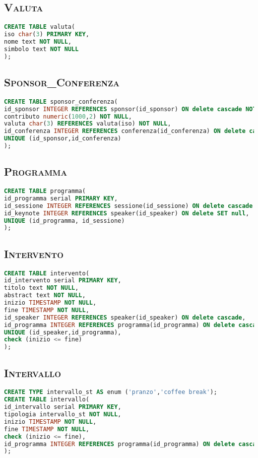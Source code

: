 \subsection{\textsc{Valuta}}
\begin{lstlisting}[language=SQL,style=mystyle,caption={Tabella: Valuta}]
CREATE TABLE valuta(
iso char(3) PRIMARY KEY,
nome text NOT NULL,
simbolo text NOT NULL
);
\end{lstlisting}
\subsection{\textsc{Sponsor\_Conferenza}}
\begin{lstlisting}[language=SQL,style=mystyle, caption={Tabella: Sponsor\_Conferenza}]
CREATE TABLE sponsor_conferenza(
id_sponsor INTEGER REFERENCES sponsor(id_sponsor) ON delete cascade NOT NULL,
contributo numeric(1000,2) NOT NULL,
valuta char(3) REFERENCES valuta(iso) NOT NULL,
id_conferenza INTEGER REFERENCES conferenza(id_conferenza) ON delete cascade NOT NULL,
UNIQUE (id_sponsor,id_conferenza) 
);
\end{lstlisting}
\subsection{\textsc{Programma}}
\begin{lstlisting}[language=SQL,style=mystyle,caption={Tabella: Programma}]
CREATE TABLE programma(
id_programma serial PRIMARY KEY,
id_sessione INTEGER REFERENCES sessione(id_sessione) ON delete cascade NOT NULL,
id_keynote INTEGER REFERENCES speaker(id_speaker) ON delete SET null,
UNIQUE (id_programma, id_sessione)
);

\end{lstlisting}
\subsection{\textsc{Intervento}}
\begin{lstlisting}[language=SQL,style=mystyle, caption={Tabella: Intervento}]
CREATE TABLE intervento(
id_intervento serial PRIMARY KEY,
titolo text NOT NULL,
abstract text NOT NULL,
inizio TIMESTAMP NOT NULL,
fine TIMESTAMP NOT NULL,
id_speaker INTEGER REFERENCES speaker(id_speaker) ON delete cascade,
id_programma INTEGER REFERENCES programma(id_programma) ON delete cascade NOT NULL,
UNIQUE (id_speaker,id_programma), 
check (inizio <= fine) 
);
\end{lstlisting}
\subsection{\textsc{Intervallo}}
\begin{lstlisting}[language=SQL,style=mystyle, caption={Tabella: Programma}]
CREATE TYPE intervallo_st AS enum ('pranzo','coffee break');
CREATE TABLE intervallo(
id_intervallo serial PRIMARY KEY,
tipologia intervallo_st NOT NULL,
inizio TIMESTAMP NOT NULL,
fine TIMESTAMP NOT NULL,
check (inizio <= fine), 
id_programma INTEGER REFERENCES programma(id_programma) ON delete cascade NOT NULL
);
\end{lstlisting}
